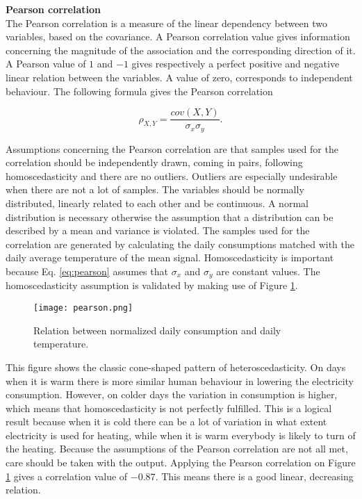 \textbf{Pearson correlation}\\
The Pearson correlation is a measure of the linear dependency between two variables, based on the covariance. A Pearson correlation value gives information concerning the magnitude of the association and the corresponding direction of it. A Pearson value of $ 1 $ and $ -1 $ gives respectively a perfect positive and negative linear relation between the variables. A value of zero, corresponds to independent behaviour. The following formula gives the Pearson correlation

\begin{equation}\label{eq:pearson}
	\rho_{X,Y} = \frac{cov(X,Y)}{\sigma_x\sigma_y}.
\end{equation}

Assumptions concerning the Pearson correlation are that samples used for the correlation should be independently drawn, coming in pairs, following homoscedasticity and there are no outliers. Outliers are especially undesirable when there are not a lot of samples. The variables should be normally distributed, linearly related to each other and be continuous. A normal distribution is necessary otherwise the assumption that a distribution can be described by a mean and variance is violated. The samples used for the correlation are generated by calculating the daily consumptions matched with the daily average temperature of the mean signal. Homoscedasticity is important because Eq. \ref{eq:pearson} assumes that $ \sigma_x $ and $ \sigma_y $ are constant values. The homoscedasticity assumption is validated by making use of Figure \ref{fig:pearson}.

\begin{figure}[h!]
	\centering
	\texttt{[image: pearson.png]}
	\caption{Relation between normalized daily consumption and daily temperature.}
	\label{fig:pearson}
\end{figure}

This figure shows the classic cone-shaped pattern of heteroscedasticity. On days when it is warm there is more similar human behaviour in lowering the electricity consumption. However, on colder days the variation in consumption is higher, which means that homoscedasticity is not perfectly fulfilled. This is a logical result because when it is cold there can be a lot of variation in what extent electricity is used for heating, while when it is warm everybody is likely to turn of the heating. Because the assumptions of the Pearson correlation are not all met, care should be taken with the output. Applying the Pearson correlation on Figure \ref{fig:pearson} gives a correlation value of $ -0.87 $. This means there is a good linear, decreasing relation.\\



